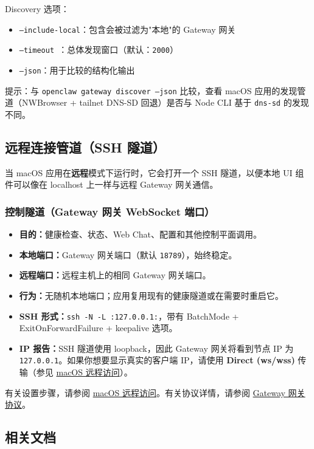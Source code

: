 Discovery 选项：

\begin{itemize}
  \item \texttt{--include-local}：包含会被过滤为"本地"的 Gateway 网关
  \item \texttt{--timeout }：总体发现窗口（默认：\texttt{2000}）
  \item \texttt{--json}：用于比较的结构化输出
\end{itemize}


提示：与 \texttt{openclaw gateway discover --json} 比较，查看 macOS 应用的发现管道（NWBrowser + tailnet DNS-SD 回退）是否与 Node CLI 基于 \texttt{dns-sd} 的发现不同。

\subsection{远程连接管道（SSH 隧道）}


当 macOS 应用在\textbf{远程}模式下运行时，它会打开一个 SSH 隧道，以便本地 UI 组件可以像在 localhost 上一样与远程 Gateway 网关通信。

\subsubsection{控制隧道（Gateway 网关 WebSocket 端口）}


\begin{itemize}
  \item \textbf{目的：}健康检查、状态、Web Chat、配置和其他控制平面调用。
  \item \textbf{本地端口：}Gateway 网关端口（默认 \texttt{18789}），始终稳定。
  \item \textbf{远程端口：}远程主机上的相同 Gateway 网关端口。
  \item \textbf{行为：}无随机本地端口；应用复用现有的健康隧道或在需要时重启它。
  \item \textbf{SSH 形式：}\texttt{ssh -N -L :127.0.0.1:}，带有 BatchMode + ExitOnForwardFailure + keepalive 选项。
  \item \textbf{IP 报告：}SSH 隧道使用 loopback，因此 Gateway 网关将看到节点 IP 为 \texttt{127.0.0.1}。如果你想要显示真实的客户端 IP，请使用 \textbf{Direct (ws/wss)} 传输（参见 \href{/platforms/mac/remote}{macOS 远程访问}）。
\end{itemize}


有关设置步骤，请参阅 \href{/platforms/mac/remote}{macOS 远程访问}。有关协议详情，请参阅 \href{/gateway/protocol}{Gateway 网关协议}。

\subsection{相关文档}


